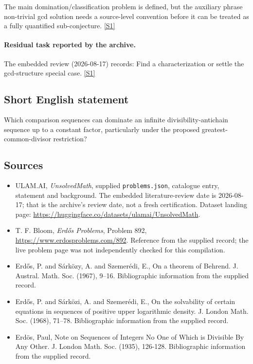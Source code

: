 \documentclass[11pt,a4paper]{article}
\newcommand{\sref}[2]{\hyperlink{source:#1:#2}{[S#2]}}
\begin{document}
The main domination/classification problem is defined, but the auxiliary phrase non-trivial gcd solution needs a source-level convention before it can be treated as a fully quantified sub-conjecture. \sref{statement}{1}

\paragraph{Residual task reported by the archive.}

The embedded review (2026-08-17) records: Find a characterization or settle the gcd-structure special case. \sref{statement}{1}

\subsection{Short English statement}

Which comparison sequences can dominate an infinite divisibility-antichain sequence up to a constant factor, particularly under the proposed greatest-common-divisor restriction?

\subsection{Sources}

{\small

\begin{itemize}

\item[\hypertarget{source:statement:1}{S1}] ULAM.AI, \emph{UnsolvedMath}, supplied \texttt{problems.json}, catalogue entry, statement and background. The embedded literature-review date is 2026-08-17; that is the archive’s review date, not a fresh certification. Dataset landing page: \url{https://huggingface.co/datasets/ulamai/UnsolvedMath}.

\item[\hypertarget{source:statement:2}{S2}] T. F. Bloom, \emph{Erdős Problems}, Problem 892, \url{https://www.erdosproblems.com/892}. Reference from the supplied record; the live problem page was not independently checked for this compilation.

\item[\hypertarget{source:statement:3}{S3}] Erd\H{o}s, P. and S\'{a}rk\"{o}zy, A. and Szemer\'{e}di, E., On a theorem of Behrend. J. Austral. Math. Soc. (1967), 9--16. Bibliographic information from the supplied record.

\item[\hypertarget{source:statement:4}{S4}] Erd\H{o}s, P. and S\'{a}rk\"{o}zi, A. and Szemer\'{e}di, E., On the solvability of certain equations in sequences of positive upper logarithmic density. J. London Math. Soc. (1968), 71--78. Bibliographic information from the supplied record.

\item[\hypertarget{source:statement:5}{S5}] Erd\"{o}s, Paul, Note on Sequences of Integers No One of Which is Divisible By Any Other. J. London Math. Soc. (1935), 126-128. Bibliographic information from the supplied record.

\end{itemize}

}

\label{end:statement}
\end{document}
